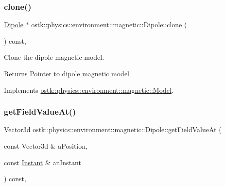 \subsubsection{\texorpdfstring{clone()}{clone()}}
{\footnotesize\ttfamily \hyperlink{classostk_1_1physics_1_1environment_1_1magnetic_1_1_dipole}{Dipole} $\ast$ ostk\+::physics\+::environment\+::magnetic\+::\+Dipole\+::clone (\begin{DoxyParamCaption}{ }\end{DoxyParamCaption}) const\hspace{0.3cm}{\ttfamily [override]}, {\ttfamily [virtual]}}



Clone the dipole magnetic model. 

\begin{DoxyReturn}{Returns}
Pointer to dipole magnetic model 
\end{DoxyReturn}


Implements \hyperlink{classostk_1_1physics_1_1environment_1_1magnetic_1_1_model_af357908c151a7809bbbc8fc676bd07b6}{ostk\+::physics\+::environment\+::magnetic\+::\+Model}.

\mbox{\label{classostk_1_1physics_1_1environment_1_1magnetic_1_1_dipole_ae2c65e41445c91b3efec455fb5077ab1}} 
\subsubsection{\texorpdfstring{get\+Field\+Value\+At()}{getFieldValueAt()}}
{\footnotesize\ttfamily Vector3d ostk\+::physics\+::environment\+::magnetic\+::\+Dipole\+::get\+Field\+Value\+At (\begin{DoxyParamCaption}\item[{const Vector3d \&}]{a\+Position,  }\item[{const \hyperlink{classostk_1_1physics_1_1time_1_1_instant}{Instant} \&}]{an\+Instant }\end{DoxyParamCaption}) const\hspace{0.3cm}{\ttfamily [override]}, {\ttfamily [virtual]}}



